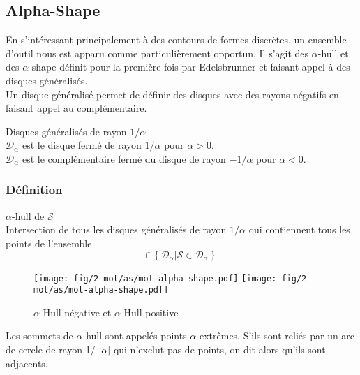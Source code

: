 \subsection{Alpha-Shape}

En s'intéressant principalement à des contours de formes discrètes, un ensemble d'outil nous est apparu comme particulièrement opportun. Il s'agit des $\alpha$-hull et des $\alpha$-shape définit pour la première fois par Edelsbrunner \cite{EdeKirSei83} et faisant appel à des disques généralisés.\\

Un disque généralisé permet de définir des disques avec des rayons négatifs en faisant appel au complémentaire.

\begin{Definition}{Disques généralisés de rayon $1/\alpha$}\\
\label{def:dis-gen}
   $\mathcal{D}_{\alpha}$ est le disque fermé de rayon $1/\alpha$ pour $\alpha > 0$.\\
   $\mathcal{D}_{\alpha}$ est le complémentaire fermé du disque de rayon $- 1/\alpha$ pour $\alpha < 0$.
\end{Definition}

\subsubsection{Définition}

\begin{Definition}{$\alpha$-hull de $\mathcal{S}$}\\
\label{def:ah-txt}
    Intersection de tous les disques généralisés de rayon $1/\alpha$ qui contiennent tous les points de l'ensemble.
    $$\cap \left\{ \mathcal{D}_{\alpha} | \mathcal{S} \in \mathcal{D}_{\alpha} \right\}$$
\end{Definition}

\begin{figure}[h!]
  \centering
  \texttt{[image: fig/2-mot/as/mot-alpha-shape.pdf]}
  \texttt{[image: fig/2-mot/as/mot-alpha-shape.pdf]}
  \caption{$\alpha$-Hull négative et $\alpha$-Hull positive }
\end{figure}
  

Les sommets de $\alpha$-hull sont appelés points $\alpha$-extrêmes. S'ils sont reliés par un arc de cercle de rayon 1/ $\lvert \alpha \rvert$ qui n'exclut pas de points, on dit alors qu'ils sont adjacents.

